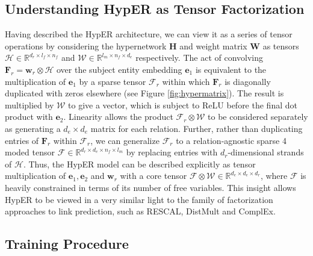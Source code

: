 \documentclass[runningheads]{llncs}
\begin{document}
\subsection{Understanding HypER as Tensor Factorization}

Having described the HypER architecture, we can view it as a series of tensor operations by considering the hypernetwork $\mathbf{H}$ and weight matrix $\mathbf{W}$ as tensors $\mathcal{H}\in \mathbb{R}^{d_r \times l_f \times n_f}$ and $\mathcal{W}\in \mathbb{R}^{l_m \times n_f \times d_e}$ respectively. The act of convolving $\mathbf{F}_r = \mathbf{w}_r\otimes\mathcal{H}$ over the subject entity embedding $\mathbf{e}_1$ is equivalent to the multiplication of $\mathbf{e}_1$ by a sparse tensor $\mathcal{F}_r$ within which $\mathbf{F}_r$ is diagonally duplicated with zeros elsewhere (see Figure \ref{fig:hypermatrix}). The result is multiplied by  $\mathcal{W}$ to give a vector, which is subject to ReLU before the final dot product with $\mathbf{e}_2$. Linearity allows the product $\mathcal{F}_r\otimes\mathcal{W}$ to be considered separately as generating a $d_e\times d_e$ matrix for each relation. Further, rather than duplicating entries of $\mathbf{F}_r$ within $\mathcal{F}_r$, we can generalize $\mathcal{F}_r$ to a relation-agnostic sparse 4 moded tensor $\mathcal{F}\in\mathbb{R}^{d_r \times d_e \times n_f \times l_m}$ by replacing entries with $d_r$-dimensional strands of $\mathcal{H}$. Thus, the HypER model can be described explicitly as tensor multiplication of $\mathbf{e}_1, \mathbf{e}_2$ and $\mathbf{w}_r$ with a core tensor $\mathcal{F}\otimes\mathcal{W}\in\mathbb{R}^{d_e\times d_e\times d_r}$, where $\mathcal{F}$ is heavily constrained in terms of its number of free variables. This insight allows HypER to be viewed in a very similar light to the family of factorization approaches to link prediction, such as RESCAL, DistMult and ComplEx.

\subsection{Training Procedure}
\end{document}
